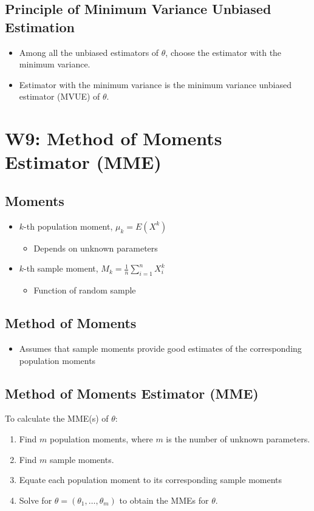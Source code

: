 \documentclass[a4paper]{article}
\begin{document}
\subsection{Principle of Minimum Variance Unbiased Estimation}
\begin{itemize}
    \item Among all the unbiased estimators of $\theta$, choose the estimator with the minimum variance.
    \item Estimator with the minimum variance is the minimum variance unbiased estimator (MVUE) of $\theta$.
\end{itemize}
\newpage
\section{W9: Method of Moments Estimator (MME)}
\subsection{Moments}
\begin{itemize}
    \item $k$-th population moment, $\mu_{k} = E(X^k)$
    \begin{itemize}[label=$\circ$]
        \item Depends on unknown parameters
    \end{itemize}
    \item $k$-th sample moment, $\displaystyle M_{k} = \frac{1}{n}\sum_{i=1}^{n}X_{i}^{k}$
    \begin{itemize}[label=$\circ$]
        \item Function of random sample
    \end{itemize}
\end{itemize}
\subsection{Method of Moments}
\begin{itemize}
    \item Assumes that sample moments provide good estimates of the corresponding population moments
\end{itemize}
\subsection{Method of Moments Estimator (MME)}
To calculate the MME(s) of $\theta$:
\begin{enumerate}
    \item Find $m$ population moments, where $m$ is the number of unknown parameters.
    \item Find $m$ sample moments.
    \item Equate each population moment to its corresponding sample moments
    \item Solve for $\theta = (\theta_{1}, \ldots, \theta_{m})$ to obtain the MMEs for $\theta$.
\end{enumerate}
\newpage
\end{document}
